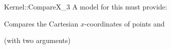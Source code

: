 \begin{ccRefFunctionObjectConcept}{Kernel::CompareX_3}
A model for this must provide:


      {Compares the Cartesian $x$-coordinates of points  and
      }

\ccRefines
{} (with two arguments)

\ccSeeAlso
{}  \\

\end{ccRefFunctionObjectConcept}
